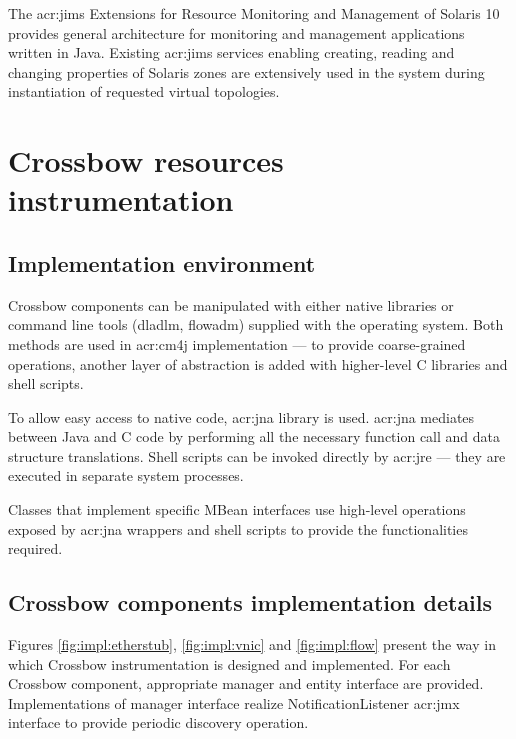 \documentclass[11pt,openany]{book}
\begin{document}
      The \gls{acr:jims} Extensions for Resource Monitoring and Management of Solaris 10 provides general architecture
      for monitoring and management applications written in Java. Existing \gls{acr:jims} services enabling creating,
      reading and changing properties of Solaris zones are extensively used in the system during instantiation of
      requested virtual topologies.


    \section{Crossbow resources instrumentation}

      \subsection{Implementation environment}
      \label{sec:impl:env}

        Crossbow components can be manipulated with either native libraries or command line tools (dladlm, flowadm)
        supplied with the operating system. Both methods are used in \gls{acr:cm4j} implementation --- to provide
        coarse-grained operations, another layer of abstraction is added with higher-level C libraries and shell scripts.

        To allow easy access to native code, \gls{acr:jna} library is used. \gls{acr:jna} mediates between Java and C
        code by performing all the necessary function call and data structure translations. Shell scripts can be invoked
        directly by \gls{acr:jre} --- they are executed in separate system processes.

        Classes that implement specific MBean interfaces use high-level operations exposed by \gls{acr:jna} wrappers and
        shell scripts to provide the functionalities required.


      \subsection{Crossbow components implementation details}
      \label{sec:impl:comp}

        Figures \ref{fig:impl:etherstub}, \ref{fig:impl:vnic} and \ref{fig:impl:flow} present the way in which Crossbow
        instrumentation is designed and implemented. For each Crossbow component, appropriate manager and entity
        interface are provided. Implementations of manager interface realize NotificationListener \gls{acr:jmx}
        interface to provide periodic discovery operation.
\end{document}
